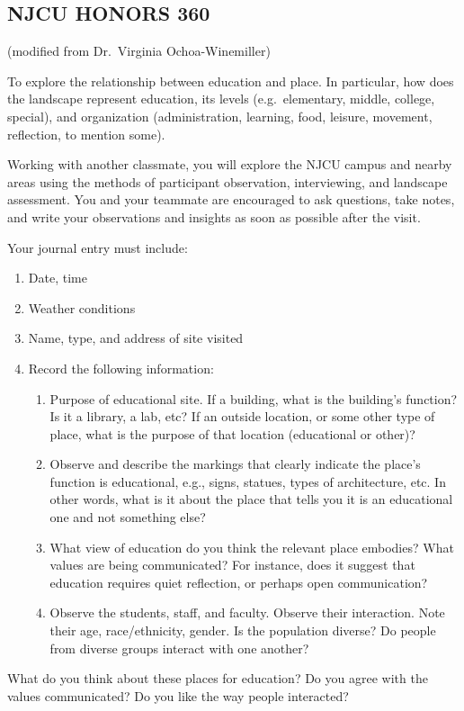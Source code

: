 \documentclass[]{article}
\author{Scott O’Connor}
\providecommand{\tightlist}{%
  \setlength{\itemsep}{0pt}\setlength{\parskip}{0pt}}
\begin{document}
\subsection{NJCU HONORS 360}\label{njcu-honors-360}

(modified from Dr.~Virginia Ochoa-Winemiller)

\begin{description}
\tightlist
\item[\textbf{Objective:}]
To explore the relationship between education and place. In particular,
how does the landscape represent education, its levels (e.g.~elementary,
middle, college, special), and organization (administration, learning,
food, leisure, movement, reflection, to mention some).
\item[\textbf{Task:}]
Working with another classmate, you will explore the NJCU campus and
nearby areas using the methods of participant observation, interviewing,
and landscape assessment. You and your teammate are encouraged to ask
questions, take notes, and write your observations and insights as soon
as possible after the visit.
\end{description}

Your journal entry must include:

\begin{enumerate}
\def\labelenumi{\arabic{enumi}.}
\tightlist
\item
  Date, time
\item
  Weather conditions
\item
  Name, type, and address of site visited
\item
  Record the following information:

  \begin{enumerate}
  \def\labelenumii{\arabic{enumii}.}
  \tightlist
  \item
    Purpose of educational site. If a building, what is the building's
    function? Is it a library, a lab, etc? If an outside location, or
    some other type of place, what is the purpose of that location
    (educational or other)?
  \item
    Observe and describe the markings that clearly indicate the place's
    function is educational, e.g., signs, statues, types of
    architecture, etc. In other words, what is it about the place that
    tells you it is an educational one and not something else?
  \item
    What view of education do you think the relevant place embodies?
    What values are being communicated? For instance, does it suggest
    that education requires quiet reflection, or perhaps open
    communication?
  \item
    Observe the students, staff, and faculty. Observe their interaction.
    Note their age, race/ethnicity, gender. Is the population diverse?
    Do people from diverse groups interact with one another?
  \end{enumerate}
\end{enumerate}

What do you think about these places for education? Do you agree with
the values communicated? Do you like the way people interacted?
\end{document}

